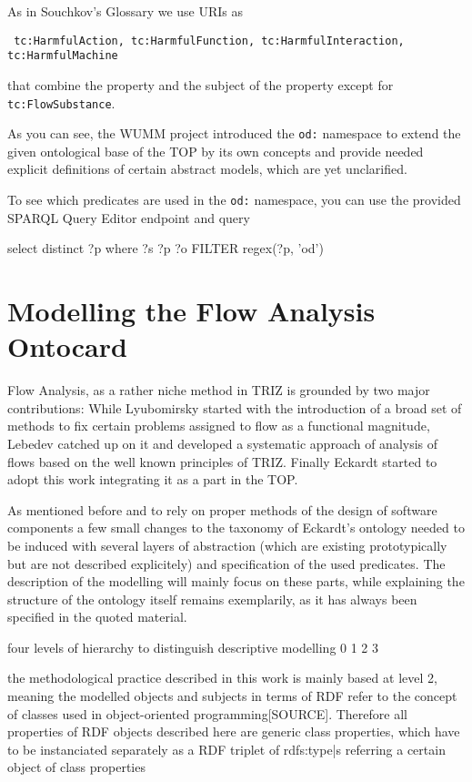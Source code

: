 \documentclass[a4paper,11pt]{article}
\begin{document}
    As in Souchkov's Glossary we use URIs as 
    \begin{center}\tt
    tc:HarmfulAction, tc:HarmfulFunction, tc:HarmfulInteraction,
    tc:HarmfulMachine
    \end{center}
    that combine the property and the subject of the property except for
    \texttt{tc:FlowSubstance}.

    As you can see, the WUMM project introduced the \texttt{od:} namespace to
    extend the given ontological base of the TOP by its own concepts and 
    provide needed explicit definitions of certain abstract models, which
    are yet unclarified.

    To see which predicates are used in the \texttt{od:} namespace, you can
    use the provided SPARQL Query Editor endpoint \cite{SPARQL} and query

        select distinct ?p where {?s ?p ?o FILTER regex(?p, 'od')}
    
    \section{Modelling the Flow Analysis Ontocard}
    Flow Analysis, as a rather niche method in TRIZ is grounded by two
    major contributions: While Lyubomirsky \cite{Lyubomirsky2006} started
    with the introduction of a broad set of methods to fix certain
    problems assigned to flow as a functional magnitude, Lebedev 
    \cite{Lebedev2011} \cite{Lebedyev2015} catched up on it and developed a 
    systematic approach of analysis of flows based on the well known principles
    of TRIZ. Finally Eckardt \cite{Eckardt2020} started to adopt this work
    integrating it as a part in the TOP.

    As mentioned before and to rely on proper methods of the design of 
    software components a few small changes to the taxonomy of Eckardt's 
    ontology needed to be induced with several layers of abstraction 
    (which are existing prototypically but are not described explicitely) and 
    specification of the used predicates. The description of the modelling 
    will mainly focus on these parts, while explaining the structure of the 
    ontology itself remains exemplarily, as it has always been specified in 
    the quoted material.

    four levels of hierarchy to distinguish descriptive modelling 
    0
    1
    2
    3

    the methodological practice described in this work is mainly based at 
    level 2, meaning the modelled objects and subjects in terms of RDF refer to 
    the concept of classes used in object-oriented programming[SOURCE]. 
    Therefore all properties of RDF objects described here are generic class
    properties, which have to be instanciated separately as a RDF triplet of 
    rdfs:type|s referring a certain object of class properties
\end{document}
